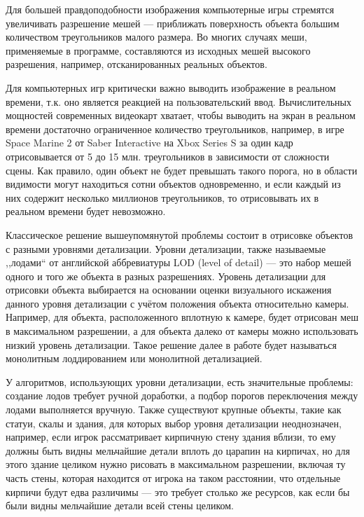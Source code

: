 Для большей правдоподобности изображения компьютерные игры стремятся увеличивать разрешение мешей --- приближать поверхность объекта большим количеством треугольников малого размера.
Во многих случаях меши, применяемые в программе, составляются из исходных мешей высокого разрешения, например, отсканированных реальных объектов.

Для компьютерных игр критически важно выводить изображение в реальном времени, т.к. оно является реакцией на пользовательский ввод.
Вычислительных мощностей современных видеокарт хватает, чтобы выводить на экран в реальном времени достаточно ограниченное количество треугольников, например, в игре Space Marine 2 от Saber Interactive на Xbox Series S за один кадр отрисовывается от 5 до 15 млн. треугольников в зависимости от сложности сцены.
Как правило, один объект не будет превышать такого порога, но в области видимости могут находиться сотни объектов одновременно, и если каждый из них содержит несколько миллионов треугольников, то отрисовывать их в реальном времени будет невозможно.

Классическое решение вышеупомянутой проблемы состоит в отрисовке объектов с разными уровнями детализации.
Уровни детализации, также называемые ,,лодами`` от английской аббревиатуры LOD (level of detail) --- это набор мешей одного и того же объекта в разных разрешениях.
Уровень детализации для отрисовки объекта выбирается на основании оценки визуального искажения данного уровня детализации с учётом положения объекта относительно камеры.
Например, для объекта, расположенного вплотную к камере, будет отрисован меш в максимальном разрешении, а для объекта далеко от камеры можно использовать низкий уровень детализации.
Такое решение далее в работе будет называться монолитным лоддированием или монолитной детализацией.

У алгоритмов, использующих уровни детализации, есть значительные проблемы: создание лодов требует ручной доработки, а подбор порогов переключения между лодами выполняется вручную.
Также существуют крупные объекты, такие как статуи, скалы и здания, для которых выбор уровня детализации неоднозначен, например, если игрок рассматривает кирпичную стену здания вблизи, то ему должны быть видны мельчайшие детали вплоть до царапин на кирпичах, но для этого здание целиком нужно рисовать в максимальном разрешении, включая ту часть стены, которая находится от игрока на таком расстоянии, что отдельные кирпичи будут едва различимы --- это требует столько же ресурсов, как если бы были видны мельчайшие детали всей стены целиком.

